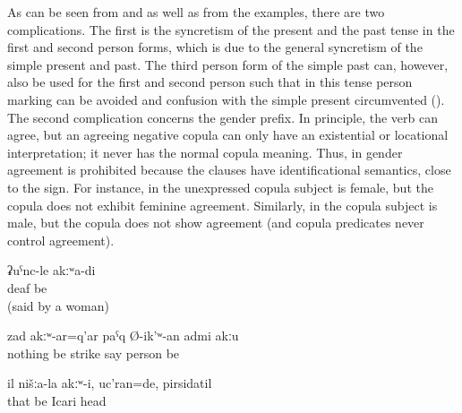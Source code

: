 As can be seen from  and  as well as from the examples, there are two complications. The first is the syncretism of the present and the past tense in the first and second person forms, which is due to the general syncretism of the simple present and past. The third person form of the simple past can, however, also be used for the first and second person such that in this tense person marking can be avoided and confusion with the simple present circumvented (). The second complication concerns the gender prefix. In principle, the verb can agree, but an agreeing negative copula can only have an existential or locational interpretation; it never has the normal copula meaning. Thus, in  gender agreement is prohibited because the clauses have identificational semantics, close to the \tit{=} sign. For instance, in  the unexpressed copula subject is female, but the copula does not exhibit feminine agreement. Similarly, in  the copula subject is male, but the copula does not show agreement (and copula predicates never control agreement).
%
\begin{exe}
	\ex	\label{ex:I am not deaf}
	\gll	ʡuˁnc-le	akːʷa-di\\
		deaf	be\\
	\glt	{} (said by a woman)

	\ex	\label{ex:He is not the person who beats without anything}
	\gll	zad	akːʷ-ar=q'ar	paˁq	Ø-ik'ʷ-an	admi	akːu\\
		nothing	be	strike	say	person	be\\
	\glt	{}

	\ex	\label{ex:He was not one of us, he was Icari, the head (of the kolkhoz)}
	\gll	il	nišːa-la	akːʷ-i,		uc'ran=de,	pirsidatil\\
		that		be		Icari	head\\
	\glt	{}
\end{exe}

